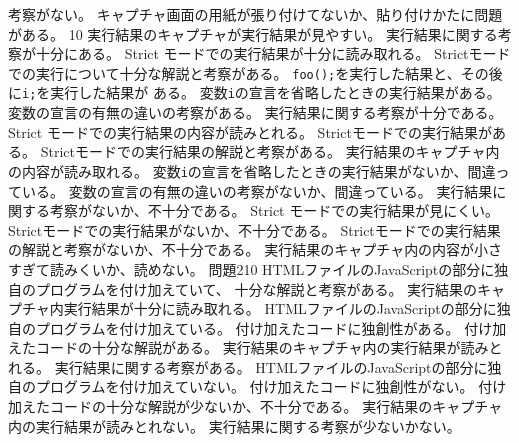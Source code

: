 {{  {考察がない。}
  {キャプチャ画面の用紙が張り付けてないか、貼り付けかたに問題がある。}
  }
	{}{10}
	{
  {実行結果のキャプチャが実行結果が見やすい。}
  {実行結果に関する考察が十分にある。}
  {Strict モードでの実行結果が十分に読み取れる。}
  {Strictモードでの実行について十分な解説と考察がある。}
  }
	{
  {\texttt{foo();}を実行した結果と、その後に\texttt{i;}を実行した結果が
  ある。}
  {変数\texttt{i}の宣言を省略したときの実行結果がある。}
  {変数の宣言の有無の違いの考察がある。}
  {実行結果に関する考察が十分である。}
  {Strict モードでの実行結果の内容が読みとれる。}
  {Strictモードでの実行結果がある。}
  {Strictモードでの実行結果の解説と考察がある。}
  {実行結果のキャプチャ内の内容が読み取れる。}
	}
	{
  {変数\texttt{i}の宣言を省略したときの実行結果がないか、間違っている。}
  {変数の宣言の有無の違いの考察がないか、間違っている。}
  {実行結果に関する考察がないか、不十分である。}
  {Strict モードでの実行結果が見にくい。}
  {Strictモードでの実行結果がないか、不十分である。}
  {Strictモードでの実行結果の解説と考察がないか、不十分である。}
  {実行結果のキャプチャ内の内容が小さすぎて読みくいか、読めない。}
	}
	{問題2}{10}
	{
  {HTMLファイルのJavaScriptの部分に独自のプログラムを付け加えていて、
  十分な解説と考察がある。}
  {実行結果のキャプチャ内実行結果が十分に読み取れる。}
  }
	{
  {HTMLファイルのJavaScriptの部分に独自のプログラムを付け加えている。}
  {付け加えたコードに独創性がある。}
  {付け加えたコードの十分な解説がある。}
  {実行結果のキャプチャ内の実行結果が読みとれる。}
  {実行結果に関する考察がある。}
	}
	{
  {HTMLファイルのJavaScriptの部分に独自のプログラムを付け加えていない。}
  {付け加えたコードに独創性がない。}
  {付け加えたコードの十分な解説が少ないか、不十分である。}
  {実行結果のキャプチャ内の実行結果が読みとれない。}
  {実行結果に関する考察が少ないかない。}
	}
}
